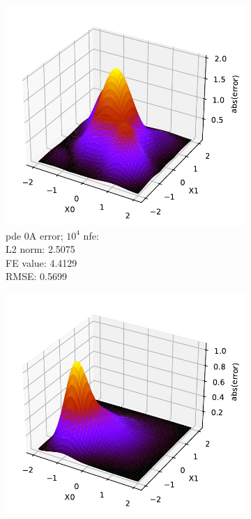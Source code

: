 \documentclass[./\jobname.tex]{subfiles}
\begin{document}
\begin{figure}[H]
	\centering
	\begin{subfigure}[b]{0.45\linewidth}
		\centering
		\includegraphics[width=1\textwidth]{../../code/experiments/experiment_0/pde0a_missing_bump_sol_10_4.pdf}
		\caption{\gls{pde} 0A error; $10^4$ \gls{nfe}: \\ L2 norm: 2.5075 \\ FE value: 4.4129 \\ RMSE: 0.5699}
		\label{fig:pde0a_sol_10_4}
	\end{subfigure}%
	\begin{subfigure}[b]{0.45\linewidth}
		\centering
		\includegraphics[width=1\textwidth]{../../code/experiments/experiment_0/pde0a_missing_bump_sol_10_6.pdf}

\end{subfigure}
\end{figure}
\end{document}
